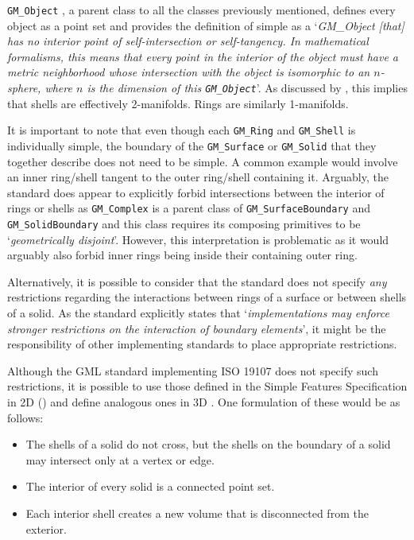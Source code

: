 \texttt{GM\_Object} \citep[\S{}6.2.2]{ISO19107:2005}, a parent class to all the classes previously mentioned, defines every object as a point set and provides the definition of simple as a `\emph{GM\_Object [that] has no interior point of self-intersection or self-tangency.
In mathematical formalisms, this means that every point in the interior of the object must have a metric neighborhood whose intersection with the object is isomorphic to an $n$-sphere, where $n$ is the dimension of this \texttt{GM\_Object}}'.
As discussed by \citet{Ledoux13}, this implies that shells are effectively 2-manifolds.
Rings are similarly 1-manifolds.

It is important to note that even though each \texttt{GM\_Ring} and \texttt{GM\_Shell} is individually simple, the boundary of the \texttt{GM\_Surface} or \texttt{GM\_Solid} that they together describe does not need to be simple.
A common example would involve an inner ring/shell tangent to the outer ring/shell containing it.
Arguably, the standard does appear to explicitly forbid intersections between the interior of rings or shells as \texttt{GM\_Complex} is a parent class of \texttt{GM\_SurfaceBoundary} and \texttt{GM\_SolidBoundary} and this class requires its composing primitives to be `\emph{geometrically disjoint}'.
However, this interpretation is problematic as it would arguably also forbid inner rings being inside their containing outer ring.

Alternatively, it is possible to consider that the standard does not specify \emph{any} restrictions regarding the interactions between rings of a surface or between shells of a solid.
As the standard explicitly states that `\emph{implementations may enforce stronger restrictions on the interaction of boundary elements}', it might be the responsibility of other implementing standards to place appropriate restrictions.

Although the GML standard \citep{GML3.2.1} implementing ISO 19107 does not specify such restrictions, it is possible to use those defined in the Simple Features Specification in 2D () and define analogous ones in 3D \citep{Ledoux13}.
One formulation of these would be as follows:

\begin{itemize}
\item The shells of a solid do not cross, but the shells on the boundary of a solid may intersect only at a vertex or edge.
\item The interior of every solid is a connected point set.
\item Each interior shell creates a new volume that is disconnected from the exterior.
\end{itemize}

